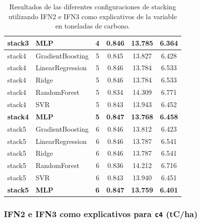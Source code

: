 \begin{table}
\begin{tabular}{llcccc}
        \textbf{stack3} & \textbf{MLP}              & \textbf{4} & \textbf{0.846} & \textbf{13.785} & \textbf{6.364} \\
        \hline
        stack4 & GradientBoosting & 5 & 0.845 & 13.827 & 6.428 \\
        stack4 & LinearRegression & 5 & 0.846 & 13.784 & 6.533 \\
        stack4 & Ridge            & 5 & 0.846 & 13.784 & 6.533 \\
        stack4 & RandomForest     & 5 & 0.834 & 14.309 & 6.771 \\
        stack4 & SVR              & 5 & 0.843 & 13.943 & 6.452 \\
        \textbf{stack4} & \textbf{MLP}              & \textbf{5} & \textbf{0.847} & \textbf{13.768} & \textbf{6.458} \\
        \hline
        stack5 & GradientBoosting & 6 & 0.846 & 13.812 & 6.423 \\
        stack5 & LinearRegression & 6 & 0.846 & 13.787 & 6.541 \\
        stack5 & Ridge            & 6 & 0.846 & 13.787 & 6.541 \\
        stack5 & RandomForest     & 6 & 0.836 & 14.212 & 6.716 \\
        stack5 & SVR              & 6 & 0.843 & 13.940 & 6.451 \\
        \textbf{stack5} & \textbf{MLP} & \textbf{6} & \textbf{0.847} & \textbf{13.759} & \textbf{6.401} \\
        \hline
    \end{tabular}
    \caption{Resultados de las diferentes configuraciones de stacking utilizando IFN2 e IFN3 como explicativos de la variable en toneladas de carbono.}
    \label{tab:stack_ifn2_ifn3_tc}
\end{table}

\subsubsection{IFN2 e IFN3 como explicativos para \texttt{c4} (tC/ha)}

